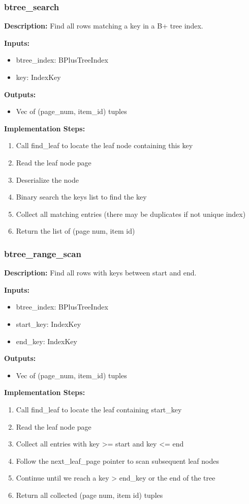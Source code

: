 \documentclass[11pt,a4paper]{article}
\begin{document}
\subsubsection{btree\_search}

\textbf{Description:} Find all rows matching a key in a B+ tree index.

\textbf{Inputs:}
\begin{itemize}
\item btree\_index: BPlusTreeIndex
\item key: IndexKey
\end{itemize}

\textbf{Outputs:}
\begin{itemize}
\item Vec of (page\_num, item\_id) tuples
\end{itemize}

\textbf{Implementation Steps:}
\begin{enumerate}
\item Call find\_leaf to locate the leaf node containing this key
\item Read the leaf node page
\item Deserialize the node
\item Binary search the keys list to find the key
\item Collect all matching entries (there may be duplicates if not unique index)
\item Return the list of (page num, item id)
\end{enumerate}

\subsubsection{btree\_range\_scan}

\textbf{Description:} Find all rows with keys between start and end.

\textbf{Inputs:}
\begin{itemize}
\item btree\_index: BPlusTreeIndex
\item start\_key: IndexKey
\item end\_key: IndexKey
\end{itemize}

\textbf{Outputs:}
\begin{itemize}
\item Vec of (page\_num, item\_id) tuples
\end{itemize}

\textbf{Implementation Steps:}
\begin{enumerate}
\item Call find\_leaf to locate the leaf containing start\_key
\item Read the leaf node page
\item Collect all entries with key >= start and key <= end
\item Follow the next\_leaf\_page pointer to scan subsequent leaf nodes
\item Continue until we reach a key > end\_key or the end of the tree
\item Return all collected (page num, item id) tuples
\end{enumerate}
\end{document}
